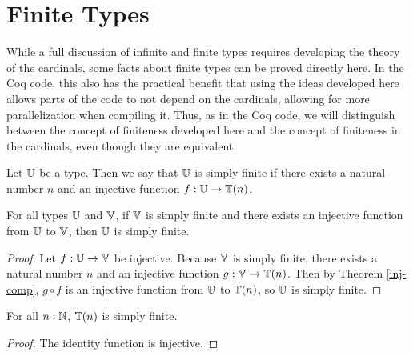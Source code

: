 \documentclass[../math.tex]{subfiles}
\begin{document}
\section{Finite Types}

While a full discussion of infinite and finite types requires developing the
theory of the cardinals, some facts about finite types can be proved directly
here.  In the Coq code, this also has the practical benefit that using the ideas
developed here allows parts of the code to not depend on the cardinals, allowing
for more parallelization when compiling it.  Thus, as in the Coq code, we will
distinguish between the concept of finiteness developed here and the concept of
finiteness in the cardinals, even though they are equivalent.

\begin{definition}
    Let $\mathbb{U}$ be a type.  Then we say that $\mathbb{U}$ is simply finite if there exists
    a natural number $n$ and an injective function $f : \mathbb{U} \to \mathbb{T}(n)$.
\end{definition}

\begin{theorem} \label{simple-finite-trans}
    For all types $\mathbb{U}$ and $\mathbb{V}$, if $\mathbb{V}$ is simply finite and there exists an
    injective function from $\mathbb{U}$ to $\mathbb{V}$, then $\mathbb{U}$ is simply finite.
\end{theorem}
\begin{proof}
    Let $f : \mathbb{U} \to \mathbb{V}$ be injective.  Because $\mathbb{V}$ is simply finite, there
    exists a natural number $n$ and an injective function $g : \mathbb{V} \to \mathbb{T}(n)$.
    Then by Theorem \ref{inj-comp}, $g \circ f$ is an injective function from
    $\mathbb{U}$ to $\mathbb{T}(n)$, so $\mathbb{U}$ is simply finite.
\end{proof}

\begin{theorem} \label{simple-finite-nat}
    For all $n : \mathbb{N}$, $\mathbb{T}(n)$ is simply finite.
\end{theorem}
\begin{proof}
    The identity function is injective.
\end{proof}
\end{document}
